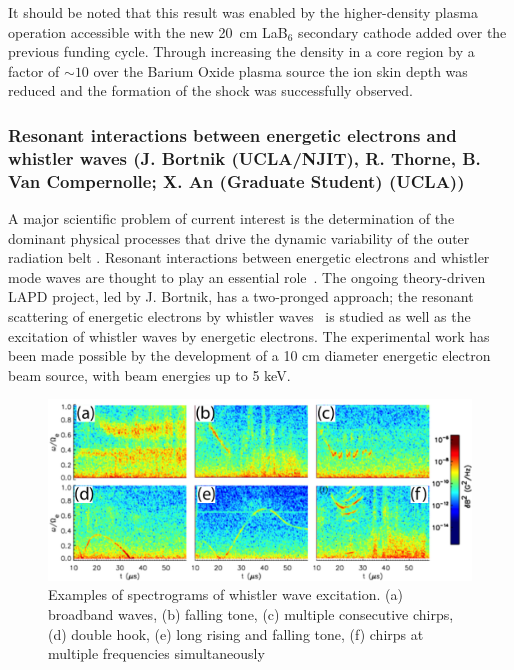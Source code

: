\documentclass[11pt]{article}
\renewcommand{\cite}{\citep}
\begin{document}
It should be noted that this result was enabled by the higher-density
plasma operation accessible with the new 20~cm LaB$_6$ secondary
cathode added over the previous funding cycle.  Through increasing the
density in a core region by a factor of $\sim 10$ over the Barium
Oxide plasma source the ion skin depth was reduced and the formation
of the shock was successfully observed.

\subsubsection{Resonant interactions between energetic electrons and whistler
waves (J. Bortnik (UCLA/NJIT), R. Thorne, B. Van Compernolle; X. An (Graduate
Student) (UCLA))}

A major scientific problem of current interest is the determination of
the dominant physical processes that drive the dynamic variability of
the outer radiation belt \cite{thorne:2010, reeves:2013}. Resonant interactions between
energetic electrons and whistler mode waves are thought to play an
essential role~\cite{horne:2005, thorne:2013}. The ongoing theory-driven
LAPD project, led by J. Bortnik, has a two-pronged approach; the
resonant scattering of energetic electrons by whistler waves~\cite{vancompernolle:2014} is studied as well as the excitation of
whistler waves by energetic electrons. The experimental work has been
made possible by the development of a 10 cm diameter energetic electron
beam source, with beam energies up to 5 keV.

\begin{figure}[!htbp]
\centerline{\includegraphics[width=5.6truein]{bortnik1a}}
\caption{\small Examples of spectrograms of whistler wave excitation. (a)
  broadband waves, (b) falling tone, (c) multiple consecutive chirps,
  (d) double hook, (e) long rising and falling tone, (f) chirps at
  multiple frequencies simultaneously}\label{bortnik1}
\end{figure}
\end{document}

